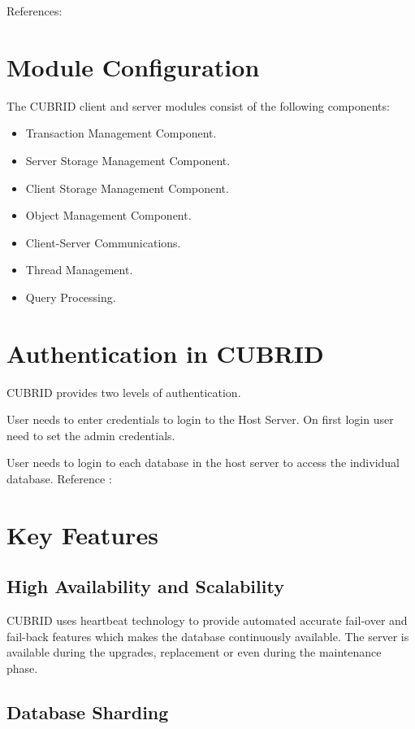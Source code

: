 \documentclass[9pt,twocolumn,twoside]{../../styles/osajnl}
\begin{document}
References: \cite{www-cubrid.org}
\newpage

\section{Module Configuration}

The CUBRID client and server modules consist of the following components:

\begin{itemize}
\item Transaction Management Component.
\item Server Storage Management Component.
\item Client Storage Management Component.
\item Object Management Component.
\item Client-Server Communications.
\item Thread Management.
\item Query Processing.
\end{itemize}

\section{Authentication in CUBRID}


CUBRID provides two levels of authentication.

User needs to enter credentials to login to the Host Server. On first
login user need to set the admin credentials.

User needs to login to each database in the host server to access the
individual database.
Reference : \cite{www-authentication}


\section{Key Features}

\subsection{High Availability and Scalability}

CUBRID uses heartbeat technology to
provide automated accurate fail-over and fail-back features which
makes the database continuously available. The server is available
during the upgrades, replacement or even during the maintenance phase.

\subsection{Database Sharding}
\end{document}
